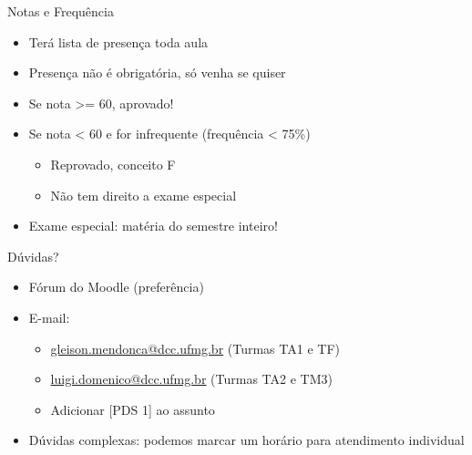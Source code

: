 \documentclass[t, aspectratio=169]{beamer}
\begin{document}
\begin{frame}[label={sec:orgce48e31}]{Notas e Frequência}
\begin{itemize}
\item Terá lista de presença toda aula
\item Presença não é obrigatória, só venha se quiser

\item Se nota >= 60, aprovado!
\item Se nota < 60 e for infrequente (frequência < 75\%)
\begin{itemize}
\item Reprovado, conceito F
\item Não tem direito a exame especial
\end{itemize}

\item Exame especial: matéria do semestre inteiro!
\end{itemize}
\end{frame}

\begin{frame}[label={sec:org44fde7d}]{Dúvidas?}
\begin{itemize}
\item Fórum do Moodle (preferência)
\item E-mail:
\begin{itemize}
\item \href{mailto:gleison.mendonca@dcc.ufmg.br}{gleison.mendonca@dcc.ufmg.br} (Turmas \alert{TA1} e \alert{TF})
\item \href{mailto:luigi.domenico@dcc.ufmg.br}{luigi.domenico@dcc.ufmg.br} (Turmas \alert{TA2} e \alert{TM3})
\item Adicionar [PDS 1] ao assunto
\end{itemize}
\item Dúvidas complexas: podemos marcar um horário para atendimento individual
\end{itemize}
\end{frame}
\end{document}
